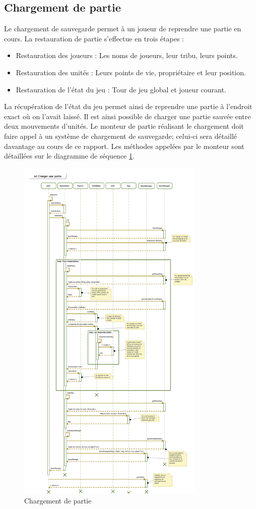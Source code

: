 \subsection{Chargement de partie}
Le chargement de sauvegarde permet à un joueur de reprendre une partie en cours. La restauration de partie s'effectue en trois étapes :
\begin{itemize}
  \item Restauration des joueurs : Les noms de joueurs, leur tribu, leurs points.
  \item Restauration des unités : Leurs points de vie, propriétaire et leur position.
  \item Restauration de l'état du jeu : Tour de jeu global et joueur courant.
\end{itemize}
La récupération de l'état du jeu permet ainsi de reprendre une partie à l'endroit exact où on l'avait laissé.
Il est ainsi possible de charger une partie sauvée entre deux mouvements d'unités.
Le monteur de partie réalisant le chargement doit faire appel à un système de chargement de sauvegarde; celui-ci sera détaillé davantage au cours de ce rapport. 
Les méthodes appelées par le monteur sont détaillées sur le diagramme de séquence \ref{fig:loadGame}.
\begin{figure}[h!]
    \centering
    \includegraphics[width=0.8\textwidth]{res/ChargerPartie.png}
    \caption{Chargement de partie}
    \label{fig:loadGame}
\end{figure}
